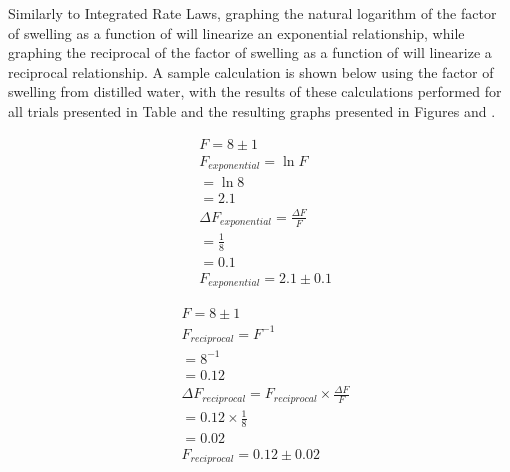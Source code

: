 \documentclass[11pt, letterpaper]{article}
\begin{document}
Similarly to Integrated Rate Laws, graphing the natural logarithm of the factor of swelling as a function
of \ce{[H+]} will linearize an exponential relationship, while
graphing the reciprocal of the factor of swelling as a function
of \ce{[H+]} will linearize a reciprocal relationship.
A sample calculation is shown below using the factor of swelling from distilled water, with the results
of these calculations performed for all trials presented
in Table  and the resulting graphs presented in Figures and .

\begin{multicols}{2}
    \begin{align*}
         & F = 8 \pm 1
        \\
         & F_{exponential} = \ln{F}
        \\
         & = \ln{8}
        \\
         & = 2.1
        \\
         & \Delta F_{exponential} = \frac{\Delta F}{F}
        \\
         & = \frac{1}{8}
        \\
         & = 0.1
        \\
         & F_{exponential} = 2.1 \pm 0.1
    \end{align*}

    \begin{align*}
         & F = 8 \pm 1
        \\
         & F_{reciprocal} = F^{-1}
        \\
         & = 8^{-1}
        \\
         & = 0.12
        \\
         & \Delta F_{reciprocal} = F_{reciprocal} \times \frac{\Delta F}{F}
        \\
         & = 0.12 \times \frac{1}{8}
        \\
         & = 0.02
        \\
         & F_{reciprocal} = 0.12 \pm 0.02
    \end{align*}
\end{multicols}
\end{document}
